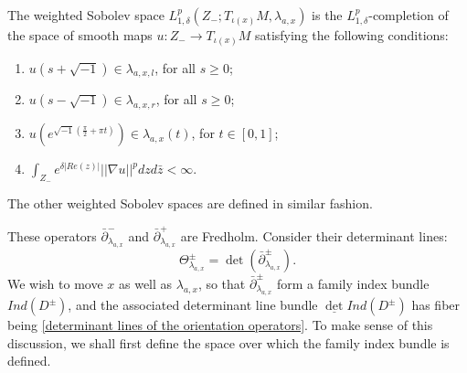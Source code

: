 \documentclass{amsart}
\numberwithin{equation}{section}
\numberwithin{figure}{section}
\begin{document}
The weighted Sobolev space $L^{p}_{1, \delta}(Z_{-}; T_{\iota(x)}M, \lambda_{a, x})$ is the $L^{p}_{1, \delta}$-completion of the space of smooth maps $u: Z_{-} \to T_{\iota(x)}M$ satisfying the following conditions:
\begin{enumerate}[label=(\roman*)]

\item $u(s+\sqrt{-1}) \in \lambda_{a, x, l}$, for all $s \ge 0$;

\item $u(s-\sqrt{-1}) \in \lambda_{a, x, r}$, for all $s \ge 0$;

\item $u(e^{\sqrt{-1}(\frac{\pi}{2}+\pi t)}) \in \lambda_{a, x}(t)$, for $t \in [0, 1]$;

\item $\int_{Z_{-}} e^{\delta |Re(z)|} ||\nabla u||^{p} dzd\bar{z} < \infty$.

\end{enumerate}
The other weighted Sobolev spaces are defined in similar fashion. \par
	These operators $\bar{\partial}_{\lambda_{a, x}}^{-}$ and $\bar{\partial}_{\lambda_{a, x}}^{+}$ are Fredholm. Consider their determinant lines:
\begin{equation}\label{determinant lines of the orientation operators}
\Theta_{\lambda_{a, x}}^{\pm} = \det(\bar{\partial}_{\lambda_{a, x}}^{\pm}).
\end{equation}
We wish to move $x$ as well as $\lambda_{a, x}$, so that $\bar{\partial}_{\lambda_{a, x}}^{\pm}$ form a family index bundle $Ind(D^{\pm})$, and the associated determinant line bundle $\underline{\det} Ind(D^{\pm})$ has fiber being \eqref{determinant lines of the orientation operators}. To make sense of this discussion, we shall first define the space over which the family index bundle is defined. \par
\end{document}
